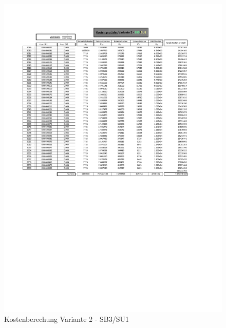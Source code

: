 \begin{figure}[h!]
	\centering
	\includegraphics[width=\textwidth]{figures/Anhang/f-00-A-V2-B3-U1}
	\caption{Kostenberechung Variante 2 - SB3/SU1}
\end{figure}

